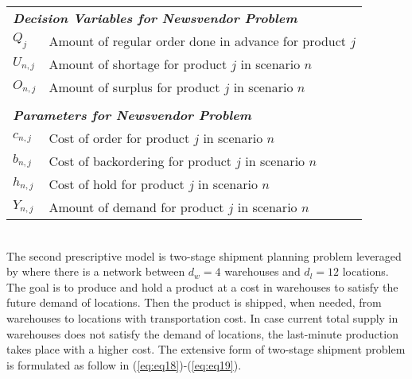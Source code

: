 \documentclass[12pt]{article}
\begin{document}
\begin{tabular}{ll}
\multicolumn{2}{l}{\textit{\textbf{Decision Variables for Newsvendor Problem}}} \\
$Q_j$&Amount of regular order done in advance for product $j$\\
$U_{n,j}$&Amount of shortage for product $j$ in scenario $n$\\
$O_{n,j}$&Amount of surplus for product $j$ in scenario $n$\\
\multicolumn{2}{l}{} \\
\multicolumn{2}{l}{\textit{\textbf{Parameters  for Newsvendor Problem}}} \\
$c_{n,j}$&Cost of order for product $j$ in scenario $n$\\
$b_{n,j}$&Cost of backordering for product $j$ in scenario $n$\\
$h_{n,j}$&Cost of hold for product $j$ in scenario $n$\\
$Y_{n,j}$&Amount of demand for product $j$ in scenario $n$\\
\end{tabular}\\

The second prescriptive model is two-stage shipment planning problem leveraged by \cite{doi:10.1287/mnsc.2018.3253} where there is a network between $d_w=4$ warehouses and $d_l=12$ locations. The goal is to produce and hold a product at a cost in warehouses to satisfy the future demand of locations. Then the product is shipped, when needed, from warehouses to locations with transportation cost. In case current total supply in warehouses does not satisfy the demand of locations, the last-minute production takes place with a higher cost. The extensive form of two-stage shipment problem is formulated as follow in (\ref{eq:eq18})-(\ref{eq:eq19}).
\end{document}
